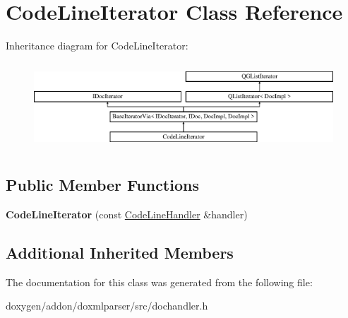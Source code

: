 \hypertarget{class_code_line_iterator}{}\section{Code\+Line\+Iterator Class Reference}
\label{class_code_line_iterator}
Inheritance diagram for Code\+Line\+Iterator\+:\begin{figure}[H]
\begin{center}
\leavevmode
\includegraphics[height=3.294118cm]{class_code_line_iterator}
\end{center}
\end{figure}
\subsection*{Public Member Functions}
\begin{DoxyCompactItemize}
\item 
\mbox{\label{class_code_line_iterator_adc89884c346b485ae81650cae47ef763}} 
{\bfseries Code\+Line\+Iterator} (const \mbox{\hyperlink{class_code_line_handler}{Code\+Line\+Handler}} \&handler)
\end{DoxyCompactItemize}
\subsection*{Additional Inherited Members}


The documentation for this class was generated from the following file\+:\begin{DoxyCompactItemize}
\item 
doxygen/addon/doxmlparser/src/dochandler.\+h\end{DoxyCompactItemize}
